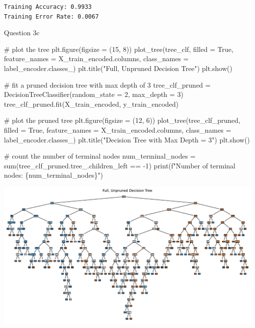 \documentclass[
  letterpaper,
  DIV=11,
  numbers=noendperiod]{scrartcl}
\newenvironment{Shaded}{\begin{snugshade}}{\end{snugshade}}
\newcommand{\BuiltInTok}[1]{\textcolor[rgb]{0.00,0.23,0.31}{#1}}
\newcommand{\CommentTok}[1]{\textcolor[rgb]{0.37,0.37,0.37}{#1}}
\newcommand{\DecValTok}[1]{\textcolor[rgb]{0.68,0.00,0.00}{#1}}
\newcommand{\NormalTok}[1]{\textcolor[rgb]{0.00,0.23,0.31}{#1}}
\newcommand{\OperatorTok}[1]{\textcolor[rgb]{0.37,0.37,0.37}{#1}}
\newcommand{\SpecialCharTok}[1]{\textcolor[rgb]{0.37,0.37,0.37}{#1}}
\newcommand{\SpecialStringTok}[1]{\textcolor[rgb]{0.13,0.47,0.30}{#1}}
\newcommand{\StringTok}[1]{\textcolor[rgb]{0.13,0.47,0.30}{#1}}
\newcommand{\VariableTok}[1]{\textcolor[rgb]{0.07,0.07,0.07}{#1}}
\begin{document}
\begin{verbatim}
Training Accuracy: 0.9933
Training Error Rate: 0.0067
\end{verbatim}

Question 3c

\begin{Shaded}
\begin{Highlighting}[]
\CommentTok{\# plot the tree }
\NormalTok{plt.figure(figsize }\OperatorTok{=}\NormalTok{ (}\DecValTok{15}\NormalTok{, }\DecValTok{8}\NormalTok{))}
\NormalTok{plot\_tree(tree\_clf, filled }\OperatorTok{=} \VariableTok{True}\NormalTok{, feature\_names }\OperatorTok{=}\NormalTok{ X\_train\_encoded.columns, class\_names }\OperatorTok{=}\NormalTok{ label\_encoder.classes\_)}
\NormalTok{plt.title(}\StringTok{"Full, Unpruned Decision Tree"}\NormalTok{)}
\NormalTok{plt.show()}

\CommentTok{\# fit a pruned decision tree with max depth of 3}
\NormalTok{tree\_clf\_pruned }\OperatorTok{=}\NormalTok{ DecisionTreeClassifier(random\_state }\OperatorTok{=} \DecValTok{2}\NormalTok{, max\_depth }\OperatorTok{=} \DecValTok{3}\NormalTok{)}
\NormalTok{tree\_clf\_pruned.fit(X\_train\_encoded, y\_train\_encoded)}

\CommentTok{\# plot the pruned tree }
\NormalTok{plt.figure(figsize }\OperatorTok{=}\NormalTok{ (}\DecValTok{12}\NormalTok{, }\DecValTok{6}\NormalTok{))}
\NormalTok{plot\_tree(tree\_clf\_pruned, filled }\OperatorTok{=} \VariableTok{True}\NormalTok{, feature\_names }\OperatorTok{=}\NormalTok{ X\_train\_encoded.columns, class\_names }\OperatorTok{=}\NormalTok{ label\_encoder.classes\_)}
\NormalTok{plt.title(}\StringTok{"Decision Tree with Max Depth = 3"}\NormalTok{)}
\NormalTok{plt.show()}

\CommentTok{\# count the number of terminal nodes }
\NormalTok{num\_terminal\_nodes }\OperatorTok{=} \BuiltInTok{sum}\NormalTok{(tree\_clf\_pruned.tree\_.children\_left }\OperatorTok{==} \OperatorTok{{-}}\DecValTok{1}\NormalTok{)}
\BuiltInTok{print}\NormalTok{(}\SpecialStringTok{f"Number of terminal nodes: }\SpecialCharTok{\{}\NormalTok{num\_terminal\_nodes}\SpecialCharTok{\}}\SpecialStringTok{"}\NormalTok{)}
\end{Highlighting}
\end{Shaded}

\includegraphics{Untitled-1_files/figure-pdf/cell-11-output-1.pdf}
\end{document}
